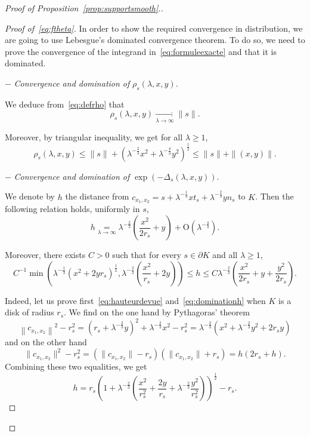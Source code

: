 \documentclass[AHL,Unicode,longabstracts,published]{cedram}
\newcommand{\Odd}{\mathrm{O}}
\newcommand{\pass}{\vspace{0.3cm}\noindent}
\newcommand{\noi}{\noindent}
\newenvironment*{prooff}{\begin{proof}}{\let\qed\relax\end{proof}}
\begin{document}
\begin{proof}[{Proof of Proposition~\ref{prop:supportsmooth}.}]
\begin{prooff}[{Proof of~\eqref{eq:ftheta}}]
In order to show the required convergence in distribution, we are going to use Lebesgue's dominated convergence theorem. To do so, we need to prove the convergence of the integrand in~\eqref{eq:formuleexacte} and that it is dominated.

$-$ \emph{Convergence and domination of} $\rho_s(\lambda,x,y)$.

We deduce from~\eqref{eq:defrho} that
\begin{equation}\label{eq:convrho}
\rho_s(\lambda,x,y)\underset{\lambda\to\infty}{\longrightarrow}\|s\|.
\end{equation}

Moreover, by triangular inequality, we get for all $\lambda\ge 1$,
\begin{equation}\label{eq:dominationrho}
\rho_s(\lambda,x,y)\le \|s\|+\left(\lambda^{-\frac{2}{3}}x^2+\lambda^{-\frac{4}{3}}y^2\right)^{\frac1{2}}\le \|s\|+\|(x,y)\|.
\end{equation}

$-$ \emph{Convergence and domination of} $\exp(-\Delta_s(\lambda,x,y))$.

We denote by $h$ the distance from $c_{x_1,x_2}=s+\lambda^{-\frac1{3}}x t_s+\lambda^{-\frac{2}{3}}y n_s$ to $K$. Then the following relation holds, uniformly in $s$,
\begin{equation}\label{eq:hauteurdevue}
h\underset{\lambda\to\infty}{=}\lambda^{-\frac{2}{3}}\left(\frac{x^2}{2r_s}+y\right)+\Odd\left(\lambda^{-\frac{4}{3}}\right).
\end{equation}

Moreover, there exists $C>0$ such that for every $s\in \partial K$ and all $\lambda\ge 1 $,
\begin{equation}\label{eq:dominationh}
C^{-1}\min\left(\lambda^{-\frac1{3}}\left(x^2+2yr_s\right)^{\frac1{2}},\lambda^{-\frac{2}{3}}\left(\frac{x^2}{r_s}+2y\right)\right)\le h\le C \lambda^{-\frac{2}{3}}\left(\frac{x^2}{2r_s}+y+\frac{y^2}{2r_s}\right).
\end{equation}

Indeed, let us prove first~\eqref{eq:hauteurdevue} and~\eqref{eq:dominationh} when $K$ is a disk of radius $r_s$. We find on the one hand by Pythagoras' theorem
\[
\left\|c_{x_1,x_2}\right\|^2-r_s^2=\left(r_s+\lambda^{-\frac{2}{3}}y\right)^2+\lambda^{-\frac{2}{3}}x^2-r_s^2=\lambda^{-\frac{2}{3}}\left(x^2+\lambda^{-\frac{2}{3}}y^2+2r_sy\right)
\]
and on the other hand
\[
\|c_{x_1,x_2}\|^2-r_s^2=(\|c_{x_1,x_2}\|-r_s)(\|c_{x_1,x_2}\|+r_s)=h(2r_s+h).
\]
Combining these two equalities, we get
\[
h=r_s\left(1+\lambda^{-\frac{2}{3}}\left(\frac{x^2}{r_s^2}+\frac{2y}{r_s}+\lambda^{-\frac{2}{3}}\frac{y^2}{r_s^2}\right)\right)^{\frac1{2}}-r_s.
\]


\end{prooff}
\end{proof}
\end{document}
